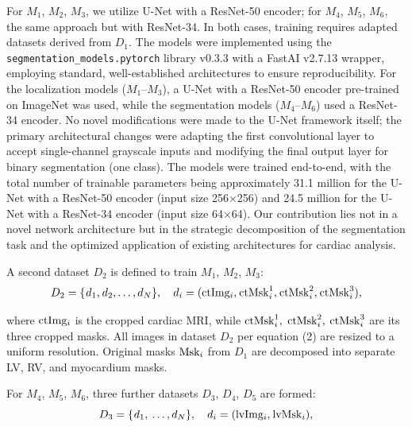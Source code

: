 \documentclass[fleqn,10pt]{wlscirep}
\begin{document}
For \({M_1}\), \({M_2}\), \({M_3}\), we utilize U-Net with a ResNet-50 encoder; for \({M_4}\), \({M_5}\), \({M_6},\) the same approach but with ResNet-34. In both cases, training requires adapted datasets derived from \({D_1}\).
The models were implemented using the \texttt{segmentation\_models.pytorch} library v0.3.3 with a FastAI v2.7.13 wrapper, employing standard, well-established architectures to ensure reproducibility. For the localization models (\({M_1}\)–\({M_3}\)), a U-Net with a ResNet-50 encoder pre-trained on ImageNet was used, while the segmentation models (\({M_4}\)–\({M_6}\)) used a ResNet-34 encoder. No novel modifications were made to the U-Net framework itself; the primary architectural changes were adapting the first convolutional layer to accept single-channel grayscale inputs and modifying the final output layer for binary segmentation (one class). The models were trained end-to-end, with the total number of trainable parameters being approximately 31.1 million for the U-Net with a ResNet-50 encoder (input size 256×256) and 24.5 million for the U-Net with a ResNet-34 encoder (input size 64×64). Our contribution lies not in a novel network architecture but in the strategic decomposition of the segmentation task and the optimized application of existing architectures for cardiac analysis.

A second dataset \({D_2}\) is defined to train \({M_1}\), \({M_2}\), \({M_3}\):
\begin{equation}
    {D_2} = \{ {\mkern 1mu} {d_1},{\mkern 1mu} {d_2}, \ldots ,{d_N}\} ,\quad {d_i} = ({\rm{ctIm}}{{\rm{g}}_i},{\mkern 1mu} {\rm{ctMsk}}_i^1,{\mkern 1mu} {\rm{ctMsk}}_i^2,{\mkern 1mu} {\rm{ctMsk}}_i^3),
\end{equation}

where \({\rm{ctIm}}{{\rm{g}}_i}\) is the cropped cardiac MRI, while \({\rm{ctMsk}}_i^1,\) \({\rm{ctMsk}}_i^2,\) \({\rm{ctMsk}}_i^3\) are its three cropped masks.
All images in dataset \({D_2}\) per equation (2) are resized to a uniform resolution. Original masks \({\rm{Ms}}{{\rm{k}}_i}\) from \({D_1}\) are decomposed into separate LV, RV, and myocardium masks.

For \({M_4}\), \({M_5}\), \({M_6}\), three further datasets \({D_3}\), \({D_4}\), \({D_5}\) are formed:
\begin{equation}
    {D_3} = \{ {\mkern 1mu} {d_1},{\mkern 1mu} \ldots ,{d_N}\} ,\quad {d_i} = ({\rm{lvIm}}{{\rm{g}}_i},{\mkern 1mu} {\rm{lvMs}}{{\rm{k}}_i}),
\end{equation}
\end{document}
